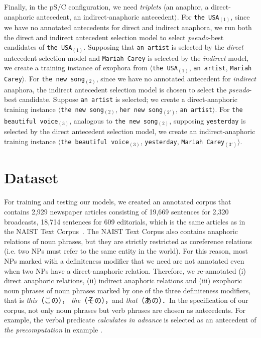 \documentclass[english]{jnlp_1.4}
\begin{document}
Finally, in the pS/C configuration, we need \emph{triplets}
$\langle$an anaphor, a direct-anaphoric antecedent, an
indirect-anaphoric antecedent$\rangle$. For \texttt{the USA$_{(1)}$},
since we have no annotated antecedents for direct and indirect
anaphora, we run both the direct and indirect antecedent selection
model to select \emph{pseudo}-best candidates of \texttt{the
  USA$_{(1)}$}. Supposing that \texttt{an artist} is selected by the
\emph{direct} antecedent selection model and \texttt{Mariah Carey} is
selected by the \emph{indirect} model, we create a training instance
of exophora from $\langle$\texttt{the USA$_{(1)}$}, \texttt{an
  artist}, \texttt{Mariah Carey}$\rangle$. For \texttt{the new
  song$_{(2)}$}, since we have no annotated antecedent for
\emph{indirect} anaphora, the indirect antecedent selection model is
chosen to select the \emph{pseudo}-best candidate. Suppose \texttt{an
  artist} is selected; we create a direct-anaphoric training instance
$\langle$\texttt{the new song$_{(2)}$}, \texttt{her new
  song$_{(2')}$}, \texttt{an artist}$\rangle$. For \texttt{the
  beautiful voice}$_{(3)}$, analogous to \texttt{the new
  song$_{(2)}$}, supposing \texttt{yesterday} is selected by the
direct antecedent selection model, we create an indirect-anaphoric
training instance $\langle$\texttt{the beautiful voice$_{(3)}$},
\texttt{yesterday}, \texttt{Mariah Carey$_{(3')}$}$\rangle$.



\section{Dataset} \label{sec:dataset}

For training and testing our models, we created an annotated corpus
that contains 2,929 newspaper articles consisting of 19,669 sentences
for 2,320 broadcasts, 18,714 sentences for 609 editorials, which is
the same articles as in the NAIST Text Corpus~. The
NAIST Text Corpus also contains anaphoric relations of noun phrases,
but they are strictly restricted as coreference relations (i.e. two NPs
must refer to the same entity in the world). For this reason, most NPs
marked with a definiteness modifier that we need are not annotated
even when two NPs have a direct-anaphoric relation. Therefore, we
re-annotated (i) direct anaphoric relations, (ii) indirect anaphoric
relations and (iii) exophoric noun phrases of noun phrases marked by
one of the three definiteness modifiers, that is \emph{this}（この），
\emph{the}（その），and \emph{that}（あの）．In the specification of our
corpus, not only noun phrases but verb phrases are chosen as
antecedents. For example, the verbal predicate \emph{calculates in
  advance} is selected as an antecedent of \emph{the precomputation}
in example .
\end{document}
